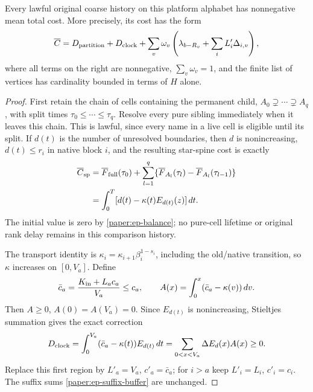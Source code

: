 \begin{proposition}\label{paper:ep-reference-positive}
Every lawful original coarse history on this platform alphabet has
nonnegative mean total cost.  More precisely, its cost has the form
\begin{equation}\label{paper:ep-reference-certificate}
 \overline C=D_{\rm partition}+D_{\rm clock}
  +\sum_v\omega_v\left(\lambda_{b-R_v}
                  +\sum_i L'_i\Delta_{i,v}\right),
\end{equation}
where all terms on the right are nonnegative, $\sum_v\omega_v=1$,
and the finite list of vertices has cardinality bounded in terms of
$H$ alone.
\end{proposition}
\begin{proof}
First retain the chain of cells containing the permanent child,
$A_0\supsetneq\cdots\supsetneq A_q$, with split times
$\tau_0\leq\cdots\leq\tau_q$.  Resolve every pure sibling immediately
when it leaves this chain.  This is lawful, since every name in a live
cell is eligible until its split.  If $d(t)$ is the number of unresolved
boundaries, then $d$ is nonincreasing, $d(t)\leq r_i$ in native block
$i$, and the resulting star-spine cost is exactly
\begin{align}
 \overline C_{\rm sp}
 &=\overline F_{\rm full}(\tau_0)
       +\sum_{l=1}^q\{\overline F_{A_l}(\tau_l)
                         -\overline F_{A_l}(\tau_{l-1})\}\\
 &=\int_0^T[d(t)-\kappa(t)E_{d(t)}(z)]\,dt.\label{paper:ep-spine-integral}
\end{align}
The initial value is zero by \eqref{paper:ep-balance}; no pure-cell
lifetime or original rank delay remains in this comparison history.

The transport identity is
$\kappa_i=\kappa_{i+1}\beta_i^{1-s_i}$, including the old/native
transition, so $\kappa$ increases on $[0,V_a]$.  Define
\[
 \bar c_a=\frac{K_{\rm in}+L_ac_a}{V_a}\leq c_a,\qquad
 A(x)=\int_0^x(\bar c_a-\kappa(v))\,dv.
\]
Then $A\geq0$, $A(0)=A(V_a)=0$.  Since $E_{d(t)}$ is nonincreasing,
Stieltjes summation gives the exact correction
\[
 D_{\rm clock}=\int_0^{V_a}(\bar c_a-\kappa(t))E_{d(t)}\,dt
              =\sum_{0<x<V_a}\Delta E_{d}(x)A(x)\geq0.
\]
Replace this first region by $L'_a=V_a$, $c'_a=\bar c_a$; for $i>a$
keep $L'_i=L_i$, $c'_i=c_i$.  The suffix sums
\eqref{paper:ep-suffix-buffer} are unchanged.


\end{proof}
